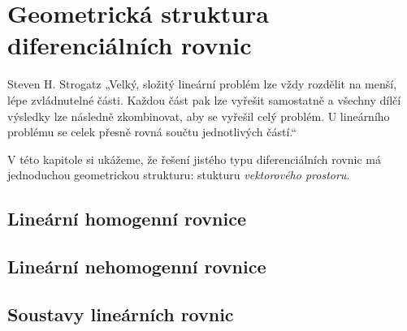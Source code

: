\chapter{Geometrická struktura diferenciálních rovnic}
\begin{chapquote}{Steven H. Strogatz}%
 „Velký, složitý lineární problém lze vždy rozdělit na menší, lépe zvládnutelné části. Každou část pak lze vyřešit samostatně a všechny dílčí výsledky lze následně zkombinovat, aby se vyřešil celý problém. U lineárního problému se celek přesně rovná součtu jednotlivých částí.“
\end{chapquote}
V této kapitole si ukážeme, že řešení jistého typu diferenciálních rovnic má jednoduchou geometrickou strukturu: stukturu \emph{vektorového prostoru}.
\section{Lineární homogenní rovnice}
\section{Lineární nehomogenní rovnice}
\section{Soustavy lineárních rovnic}

